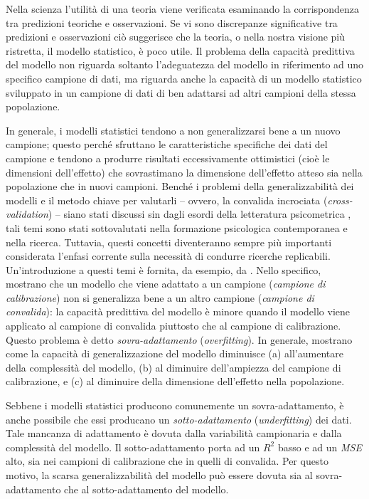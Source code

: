 \documentclass[
  10pt,
  italian,
  a4paper,
  extrafontsizes,onecolumn,openright
  ]{memoir}
\newlength{\rf}
\theoremstyle{definition}
\theoremstyle{definition}
\theoremstyle{definition}
\theoremstyle{definition}
\theoremstyle{remark}
\begin{document}
Nella scienza l'utilità di una teoria viene verificata esaminando la corrispondenza tra predizioni teoriche e osservazioni. Se vi sono discrepanze significative tra predizioni e osservazioni ciò suggerisce che la teoria, o nella nostra visione più ristretta, il modello statistico, è poco utile. Il problema della capacità predittiva del modello non riguarda soltanto l'adeguatezza del modello in riferimento ad uno specifico campione di dati, ma riguarda anche la capacità di un modello statistico sviluppato in un campione di dati di ben adattarsi ad altri campioni della stessa popolazione.

In generale, i modelli statistici tendono a non generalizzarsi bene a un nuovo campione; questo perché sfruttano le caratteristiche specifiche dei dati del campione e tendono a produrre risultati eccessivamente ottimistici (cioè le dimensioni dell'effetto) che sovrastimano la dimensione dell'effetto atteso sia nella popolazione che in nuovi campioni. Benché i problemi della generalizzabilità dei modelli e il metodo chiave per valutarli -- ovvero, la convalida incrociata (\emph{cross-validation}) -- siano stati discussi sin dagli esordi della letteratura psicometrica \autocite{lord1950efficiency}, tali temi sono stati sottovalutati nella formazione psicologica contemporanea e nella ricerca. Tuttavia, questi concetti diventeranno sempre più importanti considerata l'enfasi corrente sulla necessità di condurre ricerche replicabili. Un'introduzione a questi temi è fornita, da esempio, da \textcite{song2021making}. Nello specifico, \textcite{song2021making} mostrano che un modello che viene adattato a un campione (\emph{campione di calibrazione}) non si generalizza bene a un altro campione (\emph{campione di convalida}): la capacità predittiva del modello è minore quando il modello viene applicato al campione di convalida piuttosto che al campione di calibrazione. Questo problema è detto \emph{sovra-adattamento} (\emph{overfitting}). In generale, \textcite{song2021making} mostrano come la capacità di generalizzazione del modello diminuisce (a) all'aumentare della complessità del modello, (b) al diminuire dell'ampiezza del campione di calibrazione, e (c) al diminuire della dimensione dell'effetto nella popolazione.

Sebbene i modelli statistici producono comunemente un sovra-adattamento, è anche possibile che essi producano un \emph{sotto-adattamento} (\emph{underfitting}) dei dati. Tale mancanza di adattamento è dovuta dalla variabilità campionaria e dalla complessità del modello. Il sotto-adattamento porta ad un \(R^2\) basso e ad un \emph{MSE} alto, sia nei campioni di calibrazione che in quelli di convalida. Per questo motivo, la scarsa generalizzabilità del modello può essere dovuta sia al sovra-adattamento che al sotto-adattamento del modello.
\end{document}
